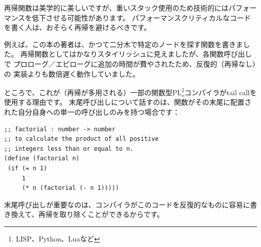 \label{Recursion_and_tail_call}
\myindex{\Recursion}
再帰関数は美学的に美しいですが、重いスタック使用のため技術的にはパフォーマンスを低下させる可能性があります。
パフォーマンスクリティカルなコードを書く人は、おそらく再帰を避けるべきです。

例えば、この本の著者は、かつて二分木で特定のノードを探す関数を書きました。
再帰関数としてはかなりスタイリッシュに見えましたが、各関数呼び出しで
プロローグ／エピローグに追加の時間が費やされたため、反復的（再帰なし）の
実装よりも数倍遅く動作していました。

\newcommand{\FnFP}{\footnote{LISP、Python、Luaなど}}

ところで、これが（再帰が多用される）一部の関数型\ac{PL}\FnFP{}コンパイラが\gls{tail call}を使用する理由です。
末尾呼び出しについて話すのは、関数がその末尾に配置された自分自身への単一の呼び出しのみを持つ場合です：

\begin{lstlisting}[caption=Scheme{,} 例はWikipediaからコピーペーストしました]
;; factorial : number -> number
;; to calculate the product of all positive
;; integers less than or equal to n.
(define (factorial n)
 (if (= n 1)
     1
	 (* n (factorial (- n 1)))))
\end{lstlisting}

末尾呼び出しが重要なのは、コンパイラがこのコードを反復的なものに容易に書き換えて、再帰を取り除くことができるからです。